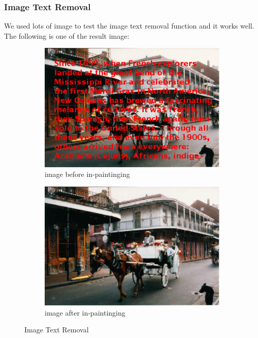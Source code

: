 \documentclass[12pt]{article}
\begin{document}
\subsubsection*{Image Text Removal}
\qquad We used lots of image to test the image text removal function and it works well. The following is one of the result image:
\begin{figure}[H]
	\begin{subfigure}[pos]{.5\textwidth}
		\centering
		\includegraphics*[width=0.8\linewidth]{horse_car.png}
		\caption{image before in-paintinging}
	\end{subfigure}%
	\begin{subfigure}[pos]{.5\textwidth}
		\centering
		\includegraphics*[width=0.8\linewidth]{horse_car_result.png}
		\caption{image after in-paintinging}
	\end{subfigure}%
	\caption{Image Text Removal}
\end{figure}
\end{document}
